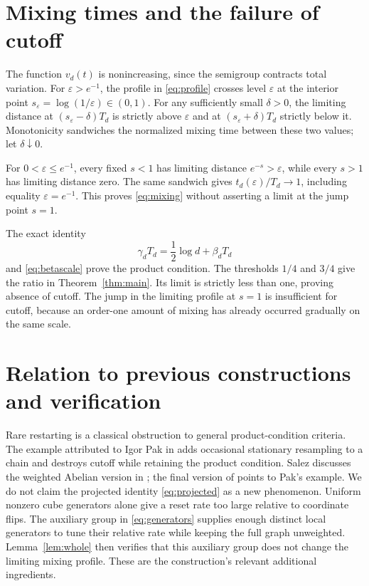 \documentclass[11pt]{article}
\theoremstyle{remark}\newtheorem{remark}[theorem]{Remark}
\begin{document}
\section{Mixing times and the failure of cutoff}
The function $v_d(t)$ is nonincreasing, since the semigroup contracts total variation. For $\varepsilon>e^{-1}$, the profile in \eqref{eq:profile} crosses level $\varepsilon$ at the interior point $s_\varepsilon=\log(1/\varepsilon)\in(0,1)$. For any sufficiently small $\delta>0$, the limiting distance at $(s_\varepsilon-\delta)T_d$ is strictly above $\varepsilon$ and at $(s_\varepsilon+\delta)T_d$ strictly below it. Monotonicity sandwiches the normalized mixing time between these two values; let $\delta\downarrow0$.

For $0<\varepsilon\le e^{-1}$, every fixed $s<1$ has limiting distance $e^{-s}>\varepsilon$, while every $s>1$ has limiting distance zero. The same sandwich gives $t_d(\varepsilon)/T_d\to1$, including equality $\varepsilon=e^{-1}$. This proves \eqref{eq:mixing} without asserting a limit at the jump point $s=1$.

The exact identity
\[
 \gamma_dT_d=\frac12\log d+\beta_dT_d
\]
and \eqref{eq:betascale} prove the product condition. The thresholds $1/4$ and $3/4$ give the ratio in Theorem~\ref{thm:main}. Its limit is strictly less than one, proving absence of cutoff. The jump in the limiting profile at $s=1$ is insufficient for cutoff, because an order-one amount of mixing has already occurred gradually on the same scale.

\section{Relation to previous constructions and verification}
Rare restarting is a classical obstruction to general product-condition criteria. The example attributed to Igor Pak in \cite[Example 18.7]{LPW} adds occasional stationary resampling to a chain and destroys cutoff while retaining the product condition. Salez discusses the weighted Abelian version in \cite[Lemma 1.3 and the following discussion]{Salez}; the final version of \cite[discussion following Theorem 1]{SalezCurvature} points to Pak's example. We do not claim the projected identity \eqref{eq:projected} as a new phenomenon. Uniform nonzero cube generators alone give a reset rate too large relative to coordinate flips. The auxiliary group in \eqref{eq:generators} supplies enough distinct local generators to tune their relative rate while keeping the full graph unweighted. Lemma~\ref{lem:whole} then verifies that this auxiliary group does not change the limiting mixing profile. These are the construction's relevant additional ingredients.
\end{document}
